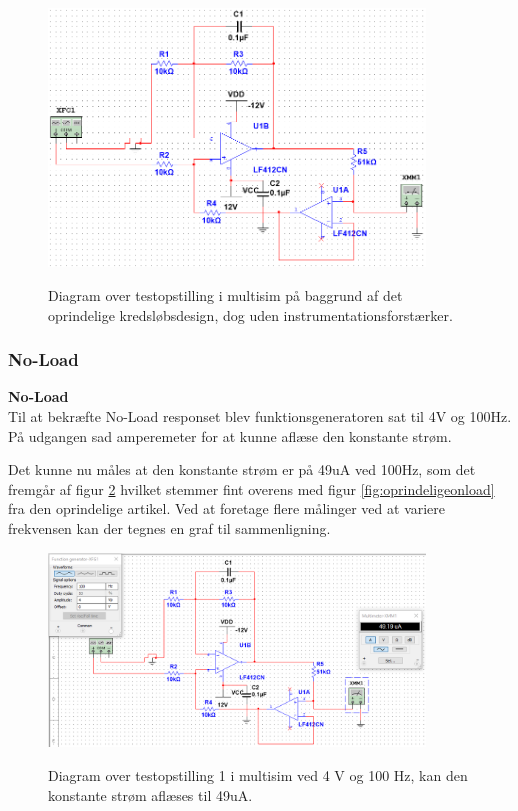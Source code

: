 \begin{figure}[H]
\centering
{\includegraphics[width=10cm]
{Figure/testopstilling1multisim}}
\caption{Diagram over testopstilling i multisim på baggrund af det oprindelige kredsløbsdesign, dog uden instrumentationsforstærker.}
\label{fig:testopstilling1multisim}
\end{figure}

\subsubsection{No-Load}
\textbf{No-Load}\\
Til at bekræfte No-Load responset blev funktionsgeneratoren sat til 4V og 100Hz. På udgangen sad amperemeter for at kunne aflæse den konstante strøm.

Det kunne nu måles at den konstante strøm er på 49uA ved 100Hz, som det fremgår af figur \ref{fig:testopstilling1multisimnoload} hvilket stemmer fint overens med figur \ref{fig:oprindeligeonload} fra den oprindelige artikel. Ved at foretage flere målinger ved at variere frekvensen kan der tegnes en graf til sammenligning.

\begin{figure}[H]
\centering
{\includegraphics[width=10cm]
{Figure/testopstilling1multisimnoload}}
\caption{Diagram over testopstilling 1 i multisim ved 4 V og 100 Hz, kan den konstante strøm aflæses til 49uA.}
\label{fig:testopstilling1multisimnoload}
\end{figure}


